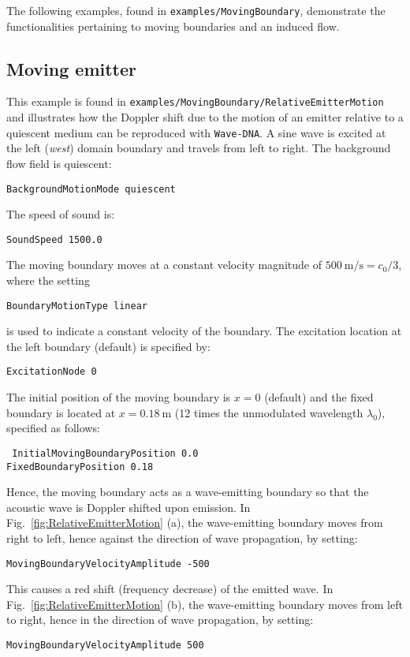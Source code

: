 The following examples, found in {\tt examples/MovingBoundary}, demonstrate the functionalities pertaining to moving boundaries and an induced flow.

\subsection{Moving emitter}

This example is found in {\tt examples/MovingBoundary/RelativeEmitterMotion} and illustrates how the Doppler shift due to the motion of an emitter relative to a quiescent medium can be reproduced with {\tt Wave-DNA}. A sine wave is excited at the left (\textit{west}) domain boundary and travels from left to right. The background flow field is quiescent:

{\tt BackgroundMotionMode quiescent}

The speed of sound is:

{\tt SoundSpeed 1500.0}

The moving boundary moves at a constant velocity magnitude of $500\:\mathrm{m/s}=c_0/3$, where the setting

    {\tt BoundaryMotionType linear}

is used to indicate a constant velocity of the boundary. The excitation location at the left boundary (default) is specified by:

{\tt ExcitationNode 0}

The initial position of the moving boundary is $x=0$ (default) and the fixed boundary is located at $x=0.18\:\mathrm{m}$ (12 times the unmodulated wavelength $\lambda_0$), specified as follows:

{\tt
InitialMovingBoundaryPosition 0.0 \\
FixedBoundaryPosition 0.18
}

Hence, the moving boundary acts as a wave-emitting boundary so that the acoustic wave is Doppler shifted upon emission. In Fig.~\ref{fig:RelativeEmitterMotion} (a), the wave-emitting boundary moves from right to left, hence against the direction of wave propagation, by setting:

{\tt MovingBoundaryVelocityAmplitude -500}

This causes a red shift (frequency decrease) of the emitted wave. In Fig.~\ref{fig:RelativeEmitterMotion} (b), the wave-emitting boundary moves from left to right, hence in the direction of wave propagation, by setting:

{\tt MovingBoundaryVelocityAmplitude 500}

